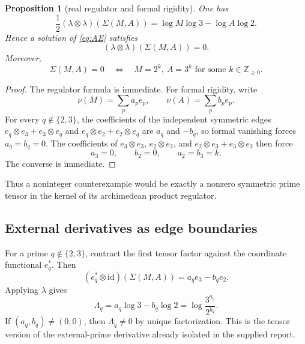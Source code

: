 \documentclass[11pt]{article}
\numberwithin{equation}{section}
\newtheorem{proposition}[theorem]{Proposition}
\theoremstyle{definition}
\theoremstyle{remark}
\newcommand{\Z}{\mathbb Z}
\begin{document}
\begin{proposition}[real regulator and formal rigidity]\label{prop:Sigma}
One has
\begin{equation}\label{eq:regSigma}
  \frac12(\lambda\otimes\lambda)(\Sigma(M,A))
  =\log M\log3-\log A\log2.
\end{equation}
Hence a solution of \eqref{eq:AE} satisfies
\begin{equation}\label{eq:regzero}
  (\lambda\otimes\lambda)(\Sigma(M,A))=0.
\end{equation}
Moreover,
\begin{equation}\label{eq:Sigmaformalzero}
  \Sigma(M,A)=0
  \quad\Longleftrightarrow\quad
  M=2^k,\ A=3^k
  \text{ for some }k\in\Z_{\ge0}.
\end{equation}
\end{proposition}

\begin{proof}
The regulator formula is immediate.  For formal rigidity, write
\[
  \nu(M)=\sum_p a_pe_p,
  \qquad
  \nu(A)=\sum_p b_pe_p.
\]
For every $q\notin\{2,3\}$, the coefficients of the independent symmetric edges $e_q\otimes e_3+e_3\otimes e_q$ and $e_q\otimes e_2+e_2\otimes e_q$ are $a_q$ and $-b_q$, so formal vanishing forces $a_q=b_q=0$.  The coefficients of $e_3\otimes e_3$, $e_2\otimes e_2$, and $e_2\otimes e_3+e_3\otimes e_2$ then force
\[
  a_3=0,
  \qquad b_2=0,
  \qquad a_2=b_3=k.
\]
The converse is immediate.
\end{proof}

Thus a noninteger counterexample would be exactly a nonzero symmetric prime tensor in the kernel of its archimedean product regulator.

\subsection{External derivatives as edge boundaries}

For a prime $q\notin\{2,3\}$, contract the first tensor factor against the coordinate functional $e_q^*$.  Then
\begin{equation}\label{eq:contraction}
  (e_q^*\otimes\mathrm{id})(\Sigma(M,A))
  =a_qe_3-b_qe_2.
\end{equation}
Applying $\lambda$ gives
\begin{equation}\label{eq:Lambdaq}
  \Lambda_q=a_q\log3-b_q\log2
  =\log\frac{3^{a_q}}{2^{b_q}}.
\end{equation}
If $(a_q,b_q)\ne(0,0)$, then $\Lambda_q\ne0$ by unique factorization.  This is the tensor version of the external-prime derivative already isolated in the supplied report.
\end{document}
